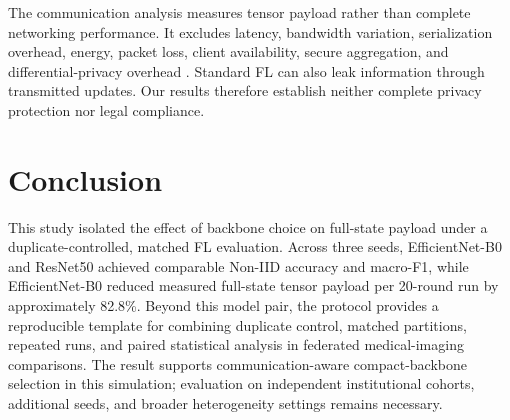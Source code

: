 \documentclass[conference]{IEEEtran}
\begin{document}
The communication analysis measures tensor payload rather than complete networking performance. It excludes latency, bandwidth variation, serialization overhead, energy, packet loss, client availability, secure aggregation, and differential-privacy overhead \cite{rieke2020future,radhika2026communication,aniket2025cfl}. Standard FL can also leak information through transmitted updates. Our results therefore establish neither complete privacy protection nor legal compliance.

\FloatBarrier
\section{Conclusion}
This study isolated the effect of backbone choice on full-state payload under a duplicate-controlled, matched FL evaluation. Across three seeds, EfficientNet-B0 and ResNet50 achieved comparable Non-IID accuracy and macro-F1, while EfficientNet-B0 reduced measured full-state tensor payload per 20-round run by approximately 82.8\%. Beyond this model pair, the protocol provides a reproducible template for combining duplicate control, matched partitions, repeated runs, and paired statistical analysis in federated medical-imaging comparisons. The result supports communication-aware compact-backbone selection in this simulation; evaluation on independent institutional cohorts, additional seeds, and broader heterogeneity settings remains necessary.



\end{document}
